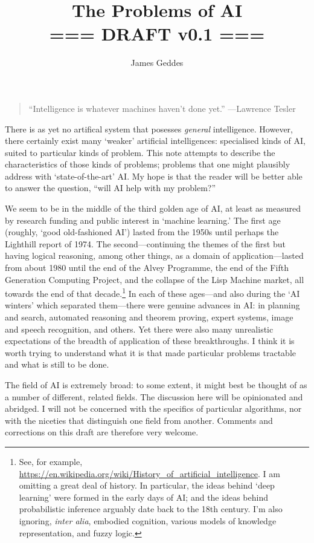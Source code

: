 \documentclass[10pt, a4paper, twocolumn]{article}
\title{The Problems of AI \\ === DRAFT v0.1 ===}
\author{James Geddes}
\begin{document}
\maketitle
\thispagestyle{empty}\pagestyle{empty}
\begin{quote}
``Intelligence is whatever machines haven't done yet.'' ---Lawrence Tesler
\end{quote}
There is as yet no artifical system that posesses \emph{general}
intelligence. However, there certainly exist many `weaker' artificial
intelligences: specialised kinds of AI, suited to particular kinds of
problem. This note attempts to describe the characteristics of those kinds of
problems; problems that one might plausibly address with `state-of-the-art'
AI\@. My hope is that the reader will be better able to answer the question,
``will AI help with my problem?''

We seem to be in the middle of the third golden age of AI, at least as measured
by research funding and public interest in `machine learning.' The first age
(roughly, `good old-fashioned AI') lasted from the 1950s until perhaps the
Lighthill report of 1974. The second---continuing the themes of the first but
having logical reasoning, among other things, as a domain of application---lasted
from about 1980 until the end of the Alvey Programme, the end of the Fifth
Generation Computing Project, and the collapse of the Lisp Machine market, all
towards the end of that decade.\footnote{See, for example,
\url{https://en.wikipedia.org/wiki/History_of_artificial_intelligence}. I am
omitting a great deal of history. In particular, the ideas behind `deep
learning' were formed in the early days of AI; and the ideas behind
probabilistic inference arguably date back to the 18th century. I'm also
ignoring, \emph{inter alia}, embodied cognition, various models of knowledge
representation, and fuzzy logic.} In each of these ages---and also during the `AI
winters' which separated them---there were genuine advances in AI: in planning and
search, automated reasoning and theorem proving, expert systems, image and
speech recognition, and others. Yet there were also many unrealistic
expectations of the breadth of application of these breakthroughs. I think it is
worth trying to understand what it is that made particular problems tractable
and what is still to be done.

The field of AI is extremely broad: to some extent, it might best be thought of
as a number of different, related fields. The discussion here will be
opinionated and abridged. I will not be concerned with the specifics of
particular algorithms, nor with the niceties that distinguish one field from
another. Comments and corrections on this draft are therefore very welcome.
\end{document}
